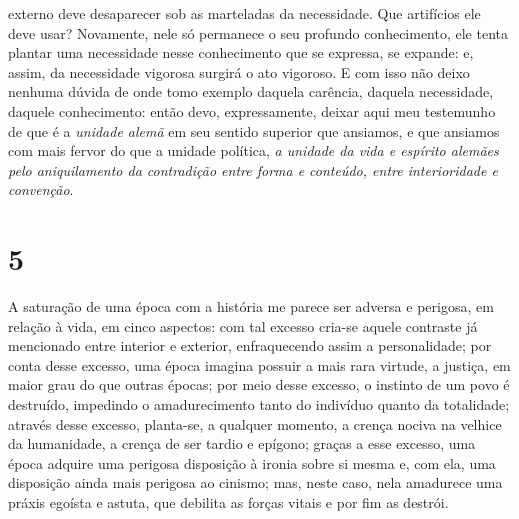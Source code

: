     externo deve desaparecer sob as marteladas da necessidade. Que
    artifícios ele deve usar? Novamente, nele só permanece o seu
    profundo conhecimento, ele tenta plantar uma necessidade nesse
    conhecimento que se expressa, se expande: e, assim, da necessidade
    vigorosa surgirá o ato vigoroso. E com isso não deixo nenhuma dúvida
    de onde tomo exemplo daquela carência, daquela necessidade, daquele
    conhecimento: então devo, expressamente, deixar aqui meu testemunho
    de que é a \emph{unidade alemã} em seu sentido superior que
    ansiamos, e que ansiamos com mais fervor do que a unidade política,
    \emph{a unidade da vida e espírito alemães pelo aniquilamento da
    contradição entre forma e conteúdo, entre interioridade e
    convenção}.

  \chapter{5}\label{capítulo-5}


A saturação de uma época com a história me parece ser adversa e perigosa,
em relação à vida, em cinco aspectos: com tal excesso cria-se aquele
contraste já mencionado entre interior e exterior, enfraquecendo assim a
personalidade; por conta desse excesso, uma época imagina possuir a mais
rara virtude, a justiça, em maior grau do que outras épocas; por meio
desse excesso, o instinto de um povo é destruído, impedindo o
amadurecimento tanto do indivíduo quanto da totalidade; através desse
excesso, planta-se, a qualquer momento, a crença nociva na velhice da
humanidade, a crença de ser tardio e epígono; graças a esse excesso, uma
época adquire uma perigosa disposição à ironia sobre si mesma e, com
ela, uma disposição ainda mais perigosa ao cinismo; mas, neste caso,
nela amadurece uma práxis egoísta e astuta, que debilita as forças
vitais e por fim as destrói.

